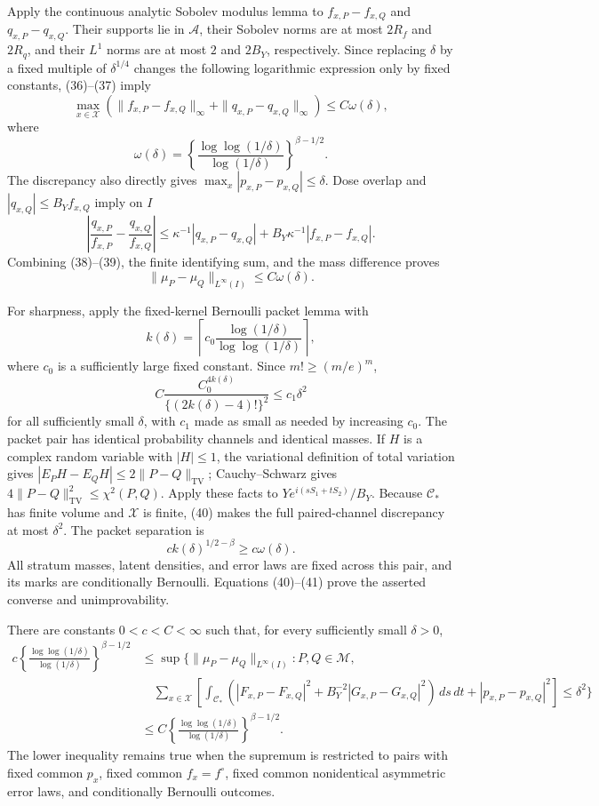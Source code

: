 Apply the continuous analytic Sobolev modulus lemma to \(f_{x,P}-f_{x,Q}\) and \(q_{x,P}-q_{x,Q}\).  Their supports lie in \(\mathcal A\), their Sobolev norms are at most \(2R_f\) and \(2R_q\), and their \(L^1\) norms are at most \(2\) and \(2B_Y\), respectively.  Since replacing \(\delta\) by a fixed multiple of \(\delta^{1/4}\) changes the following logarithmic expression only by fixed constants, (36)--(37) imply
\[
\max_{x\in\mathcal X}\left(
\|f_{x,P}-f_{x,Q}\|_\infty+
\|q_{x,P}-q_{x,Q}\|_\infty\right)
\le C\omega(\delta), \tag{38}
\]
where
\[
\omega(\delta)=
\left\{\frac{\log\log(1/\delta)}{\log(1/\delta)}\right\}^{\beta-1/2}.
\]
The discrepancy also directly gives \(\max_x|p_{x,P}-p_{x,Q}|\le\delta\).  Dose overlap and \(|q_{x,Q}|\le B_Yf_{x,Q}\) imply on \(I\)
\[
\left|\frac{q_{x,P}}{f_{x,P}}-
\frac{q_{x,Q}}{f_{x,Q}}\right|
\le \kappa^{-1}|q_{x,P}-q_{x,Q}|
+B_Y\kappa^{-1}|f_{x,P}-f_{x,Q}|. \tag{39}
\]
Combining (38)--(39), the finite identifying sum, and the mass difference proves
\[
\|\mu_P-\mu_Q\|_{L^\infty(I)}\le C\omega(\delta).
\]

For sharpness, apply the fixed-kernel Bernoulli packet lemma with
\[
k(\delta)=\left\lceil c_0
\frac{\log(1/\delta)}{\log\log(1/\delta)}\right\rceil,
\]
where \(c_0\) is a sufficiently large fixed constant.  Since \(m!\ge(m/e)^m\),
\[
C\frac{C_0^{4k(\delta)}}{\{(2k(\delta)-4)!\}^2}\le c_1\delta^2 \tag{40}
\]
for all sufficiently small \(\delta\), with \(c_1\) made as small as needed by increasing \(c_0\).  The packet pair has identical probability channels and identical masses.  If \(H\) is a complex random variable with \(|H|\le1\), the variational definition of total variation gives \(|E_PH-E_QH|\le2\|P-Q\|_{\mathrm{TV}}\); Cauchy--Schwarz gives \(4\|P-Q\|_{\mathrm{TV}}^2\le\chi^2(P,Q)\).  Apply these facts to \(Y e^{i(sS_1+tS_2)}/B_Y\).  Because \(\mathcal C_*\) has finite volume and \(\mathcal X\) is finite, (40) makes the full paired-channel discrepancy at most \(\delta^2\).  The packet separation is
\[
ck(\delta)^{1/2-\beta}\ge c\omega(\delta). \tag{41}
\]
All stratum masses, latent densities, and error laws are fixed across this pair, and its marks are conditionally Bernoulli.  Equations (40)--(41) prove the asserted converse and unimprovability.

There are constants \(0<c<C<\infty\) such that, for every sufficiently small \(\delta>0\),
\[
\begin{aligned}
c\left\{\frac{\log\log(1/\delta)}{\log(1/\delta)}\right\}^{\beta-1/2}
&\le
\sup\Bigg\{\|\mu_P-\mu_Q\|_{L^\infty(I)}:P,Q\in\mathcal M,\\
&\quad \sum_{x\in\mathcal X}\left[\int_{\mathcal C_*}
\left(|F_{x,P}-F_{x,Q}|^2+B_Y^{-2}|G_{x,P}-G_{x,Q}|^2\right)\,ds\,dt
+|p_{x,P}-p_{x,Q}|^2\right]\le\delta^2\Bigg\}\\
&\le C\left\{\frac{\log\log(1/\delta)}{\log(1/\delta)}\right\}^{\beta-1/2}.
\end{aligned}
\]
The lower inequality remains true when the supremum is restricted to pairs with fixed common \(p_x\), fixed common \(f_x=f^\circ\), fixed common nonidentical asymmetric error laws, and conditionally Bernoulli outcomes.

